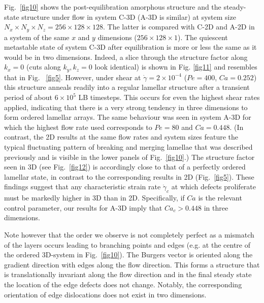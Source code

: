 \documentclass[8.5pt,twoside,twocolumn]{article}
\newcommand{\e}[1]{\times10^{#1}}
\begin{document}
Fig.~\ref{fig10} shows the post-equilibration amorphous structure and the steady-state structure under flow in system C-3D (A-3D is similar) at system size $N_x\times N_y \times N_z=256\times128\times128$. The latter is compared with C-2D and A-2D in a system of the same $x$ and $y$ dimensions ($256\times128\times1$).  The quiescent metastable state of system C-3D after equilibration is more or less the same as it would be in two dimensions. 
Indeed, a slice through the structure factor along $k_x=0$ (cuts along $k_y,k_z=0$ look identical) is shown in Fig. \ref{fig11} and resembles that in Fig.
~\ref{fig5}.
However, under shear at $\dot\gamma = 2\times 10^{-4}$ ($Pe = 400$, $Ca = 0.252$) this structure anneals readily into a regular lamellar structure after a transient period of about $6\e{5}$ LB timesteps. This occurs for even the highest shear rates applied, indicating that there is a very strong tendency in three dimensions to form ordered lamellar arrays. The same behaviour was seen in system A-3D for which the highest flow rate used corresponds to $Pe = 80$ and $Ca = 0.448$. (In contrast, the 2D results at the same flow rates and system sizes feature the typical fluctuating pattern of breaking and merging lamellae that was described previously and is visible in the lower panels of Fig.~\ref{fig10}.) The structure factor seen in 3D (see Fig.~\ref{fig12}) is accordingly close to that of a perfectly ordered lamellar state, in contrast to the corresponding results in 2D (Fig.~\ref{fig5}).
These findings suggest that any characteristic strain rate $\dot\gamma_c$ at which defects proliferate must be markedly higher in 3D than in 2D. Specifically, if $Ca$ is the relevant control parameter, our results for A-3D imply that $Ca_c > 0.448 $ in three dimensions.

Note however that the order we observe is not completely perfect as a mismatch of the layers occurs leading to branching points and edges (e.g. at the centre of the ordered 3D-system in Fig.~\ref{fig10}). 
The Burgers vector is oriented along the gradient direction with edges along the flow direction.
This forms a structure that is translationally invariant along the flow direction and in the final steady state the location of the edge defects does not change. Notably, the corresponding orientation of edge dislocations does not exist in two dimensions.
\end{document}
